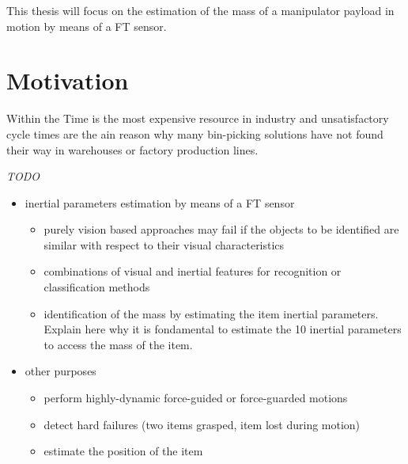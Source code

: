 \documentclass[/home/francois/latex/report/main.tex]{subfiles}
\begin{document}
This thesis will focus on the estimation of the mass of a manipulator payload in motion by means of a \ac{FT} sensor.

\section{Motivation}


Within the 
Time is the most expensive resource in industry and unsatisfactory cycle times are the ain reason why many bin-picking solutions have not found their way in warehouses or factory production lines.


\textit{TODO}

{\it

\begin{itemize}
	\item inertial parameters estimation by means of a \ac{FT} sensor
	\begin{itemize}
		\item purely vision based approaches may fail if the objects to be identified are similar with respect to their visual characteristics
		\item combinations of visual and inertial features for recognition or classification methods
		\item identification of the mass by estimating the item inertial parameters. Explain here why it is fondamental to estimate the 10 inertial parameters to access the mass of the item.
	\end{itemize}
	\item other purposes
	\begin{itemize}
		\item perform highly-dynamic force-guided or force-guarded motions \cite{Garcia2006, KubusKroger2008}
		\item detect hard failures (two items grasped, item lost during motion)
		\item estimate the position of the item
	\end{itemize}
\end{itemize}


}
\end{document}

